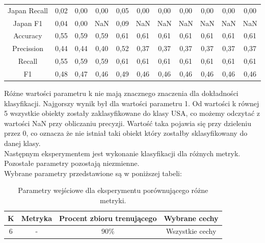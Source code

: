 \documentclass{classrep}
\begin{document}
\begin{table}[h!]
\begin{tabular}{c c c c c c c c c c c}
Japan Recall 			& 0,02 & 0,00 & 0,00 & 0,05 & 0,00 & 0,00 & 0,00 & 0,00 & 0,00 & 0,00 \\
Japan F1 				& 0,04 & 0,00 & NaN & 0,09 & NaN  & NaN & NaN & NaN & NaN & NaN\\
\hline
Accuracy 				& 0,55 & 0,59 & 0,59 & 0,61 & 0,61 & 0,61 & 0,61 & 0,61 & 0,61 & 0,61 \\
Precission 				& 0,44 & 0,44 & 0,40 & 0,52 & 0,37  & 0,37 & 0,37 &  0,37  & 0,37 & 0,37\\
Recall 				& 0,55 & 0,59 & 0,59 & 0,61 & 0,61 & 0,61 & 0,61 & 0,61 & 0,61 & 0,61  \\
F1 					& 0,48 & 0,47 & 0,46 & 0,49 & 0,46 & 0,46 & 0,46 & 0,46 & 0,46 & 0,46\\

\end {tabular}
\label {Wyniki klasyfikacji dla różnych wartości parametru k.}
\end{table}

Różne wartości parametru k nie mają znacznego znaczenia dla dokładności klasyfikacji. Najgorszy wynik był dla wartości parametru 1. Od wartości k równej 5 wszystkie obiekty zostały zaklasyfikowane do klasy USA, co możemy odczytać z wartości NaN przy obliczaniu precyzji. Wartość taka pojawia się przy dzieleniu przez 0, co oznacza że nie istniał taki obiekt który zostałby sklasyfikowany do danej klasy. \\



Następnym eksperymentem jest wykonanie klasyfikacji dla różnych metryk. Pozostałe parametry pozostają niezmienne.\\

Wybrane parametry przedstawione są w poniższej tabeli:
 
\begin{table}[h!]
\caption{Parametry wejściowe dla eksperymentu porównującego różne metryki. }
\centering
\vspace{0.1cm}
 \begin{tabular}{c c c c}
    \textbf{K} & \textbf{Metryka}   & \textbf{Procent zbioru trenującego}  & \textbf{Wybrane cechy}   \\
\hline
6 & - & 90\% &  Wszystkie cechy\\
\end {tabular}
\label {Parametry wejściowe dla eksperymentu porównującego różne metryki. }
\end{table}
\end{document}
